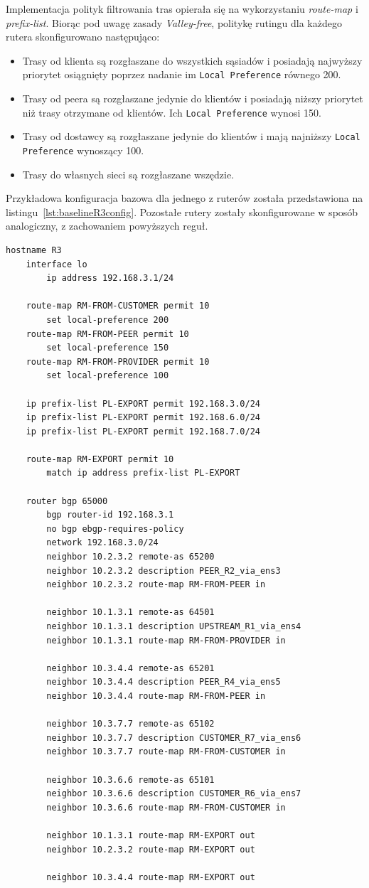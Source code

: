 Implementacja polityk filtrowania tras opierała się na wykorzystaniu \textit{route-map} i \textit{prefix-list}. Biorąc pod uwagę zasady \textit{Valley-free}, politykę rutingu dla każdego rutera skonfigurowano następująco:
\begin{itemize}
	\item Trasy od klienta są rozgłaszane do wszystkich sąsiadów i posiadają najwyższy priorytet osiągnięty poprzez nadanie im \texttt{Local Preference} równego 200.
	\item Trasy od peera są rozgłaszane jedynie do klientów i posiadają niższy priorytet niż trasy otrzymane od klientów. Ich \texttt{Local Preference} wynosi 150.
	\item Trasy od dostawcy są rozgłaszane jedynie do klientów i mają najniższy \texttt{Local Preference} wynoszący 100.
	\item Trasy do własnych sieci są rozgłaszane wszędzie.
\end{itemize}

Przykładowa konfiguracja bazowa dla jednego z ruterów została przedstawiona na listingu~\ref{lst:baselineR3config}. Pozostałe rutery zostały skonfigurowane w sposób analogiczny, z zachowaniem powyższych reguł.

\begin{lstlisting}[caption={Konfiguracja rutera R3}, label={lst:baselineR3config}]
	hostname R3
	interface lo
		ip address 192.168.3.1/24
	
	route-map RM-FROM-CUSTOMER permit 10
		set local-preference 200
	route-map RM-FROM-PEER permit 10
		set local-preference 150
	route-map RM-FROM-PROVIDER permit 10
		set local-preference 100
	
	ip prefix-list PL-EXPORT permit 192.168.3.0/24
	ip prefix-list PL-EXPORT permit 192.168.6.0/24
	ip prefix-list PL-EXPORT permit 192.168.7.0/24
	
	route-map RM-EXPORT permit 10
		match ip address prefix-list PL-EXPORT
	
	router bgp 65000
		bgp router-id 192.168.3.1
		no bgp ebgp-requires-policy
		network 192.168.3.0/24
		neighbor 10.2.3.2 remote-as 65200
		neighbor 10.2.3.2 description PEER_R2_via_ens3
		neighbor 10.2.3.2 route-map RM-FROM-PEER in
		
		neighbor 10.1.3.1 remote-as 64501
		neighbor 10.1.3.1 description UPSTREAM_R1_via_ens4
		neighbor 10.1.3.1 route-map RM-FROM-PROVIDER in
	
		neighbor 10.3.4.4 remote-as 65201
		neighbor 10.3.4.4 description PEER_R4_via_ens5
		neighbor 10.3.4.4 route-map RM-FROM-PEER in
	
		neighbor 10.3.7.7 remote-as 65102
		neighbor 10.3.7.7 description CUSTOMER_R7_via_ens6
		neighbor 10.3.7.7 route-map RM-FROM-CUSTOMER in
	
		neighbor 10.3.6.6 remote-as 65101
		neighbor 10.3.6.6 description CUSTOMER_R6_via_ens7
		neighbor 10.3.6.6 route-map RM-FROM-CUSTOMER in
	
		neighbor 10.1.3.1 route-map RM-EXPORT out
		neighbor 10.2.3.2 route-map RM-EXPORT out
		
		neighbor 10.3.4.4 route-map RM-EXPORT out
\end{lstlisting}
